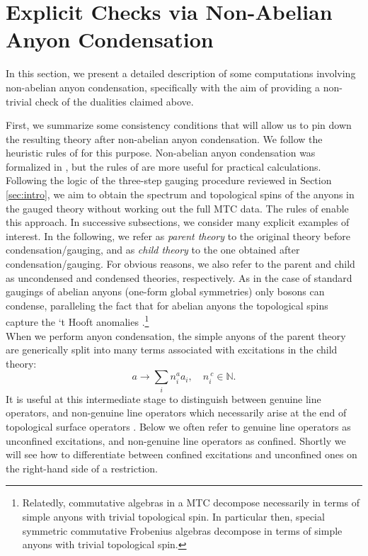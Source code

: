 \documentclass[11pt]{article}
\numberwithin{equation}{section}
\begin{document}
\section{Explicit Checks via Non-Abelian Anyon Condensation} \label{ExplicitChecks}

In this section, we present a detailed description of some computations involving non-abelian anyon condensation, specifically with the aim of providing a non-trivial check of the dualities claimed above. 

First, we summarize some consistency conditions that will allow us to pin down the resulting theory after non-abelian anyon condensation. We follow the heuristic rules of \cite{Bais:2008ni} for this purpose. Non-abelian anyon condensation was formalized in \cite{kong2014anyon}, but the rules of \cite{Bais:2008ni} are more useful for practical calculations. Following the logic of the three-step gauging procedure reviewed in Section \ref{sec:intro}, we aim to obtain the spectrum and topological spins of the anyons in the gauged theory without working out the full MTC data.  The rules of \cite{Bais:2008ni} enable this approach. In successive subsections, we consider many explicit examples of interest. In the following, we refer as \textit{parent theory} to the original theory before condensation/gauging, and as \textit{child theory} to the one obtained after condensation/gauging. For obvious reasons, we also refer to the parent and child as uncondensed and condensed theories, respectively. As in the case of standard gaugings of abelian anyons (one-form global symmetries) only bosons can condense, paralleling the fact that for abelian anyons the topological spins capture the `t Hooft anomalies \cite{Gaiotto:2014kfa, Gomis:2017ixy, Hsin:2018vcg}.\footnote{Relatedly, commutative algebras in a MTC decompose necessarily in terms of simple anyons with trivial topological spin. In particular then, special symmetric commutative Frobenius algebras decompose in terms of simple anyons with trivial topological spin.}  \\

When we perform anyon condensation, the simple anyons of the parent theory are generically split into many terms associated with excitations in the child theory:
\begin{equation}
    a \longrightarrow \sum_{i} n_{i}^{a}a_{i}, \quad n_{i}^{\ c} \in \mathbb{N}. \label{restriction}
\end{equation}
It is useful at this intermediate stage to distinguish between genuine line operators, and non-genuine line operators which necessarily arise at the end of topological surface operators \cite{Aharony:2013hda}. Below we often refer to genuine line operators as unconfined excitations, and non-genuine line operators as confined. Shortly we will see how to differentiate between confined excitations and unconfined ones on the right-hand side of a restriction.
\end{document}
